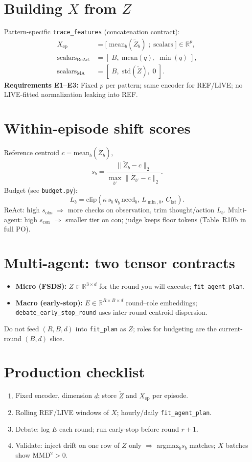 \documentclass[11pt]{article}
\begin{document}
\section{Building $X$ from $Z$}
Pattern-specific \texttt{trace\_features} (concatenation contract):
\begin{align*}
X_{\mathrm{ep}} &= \big[\;\mathrm{mean}_b(\tilde{Z}_b)\;;\;\text{scalars}\;\big] \in \mathbb{R}^{p}, \\
\text{scalars}_{\mathrm{ReAct}} &= [\;B,\;\mathrm{mean}(q),\;\min(q)\;], \\
\text{scalars}_{\mathrm{MA}} &= [\;B,\;\mathrm{std}(\tilde{Z}),\;0\;].
\end{align*}
\textbf{Requirements E1--E3:} Fixed $p$ per pattern; same encoder for REF/LIVE; no LIVE-fitted normalization leaking into REF.

\section{Within-episode shift scores}
Reference centroid $c=\mathrm{mean}_b(\tilde{Z}_b)$,
\[
s_b = \frac{\|\tilde{Z}_b-c\|_2}{\max_{b'}\|\tilde{Z}_{b'}-c\|_2}.
\]
Budget (see \texttt{budget.py}):
\[
L_b = \mathrm{clip}(\kappa\, s_b\, q_b\, \mathrm{need}_b,\, L_{\min,b},\, C_{\mathrm{lat}}).
\]
ReAct: high $s_{\mathrm{obs}}$ $\Rightarrow$ more checks on observation, trim thought/action $L_b$.
Multi-agent: high $s_{\mathrm{con}}$ $\Rightarrow$ smaller tier on con; judge keeps floor tokens (Table~R10b in full PO).

\section{Multi-agent: two tensor contracts}
\begin{itemize}[nosep]
  \item \textbf{Micro (FSDS):} $Z\in\mathbb{R}^{3\times d}$ for the round you will execute; \texttt{fit\_agent\_plan}.
  \item \textbf{Macro (early-stop):} $E\in\mathbb{R}^{R\times B\times d}$ round--role embeddings; \texttt{debate\_early\_stop\_round} uses inter-round centroid dispersion.
\end{itemize}
Do not feed $(R,B,d)$ into \texttt{fit\_plan} as $Z$; roles for budgeting are the current-round $(B,d)$ slice.

\section{Production checklist}
\begin{enumerate}
  \item Fixed encoder, dimension $d$; store $\tilde{Z}$ and $X_{\mathrm{ep}}$ per episode.
  \item Rolling REF/LIVE windows of $X$; hourly/daily \texttt{fit\_agent\_plan}.
  \item Debate: log $E$ each round; run early-stop before round $r{+}1$.
  \item Validate: inject drift on one row of $Z$ only $\Rightarrow$ argmax$_b s_b$ matches; $X$ batches show MMD$^2>0$.
\end{enumerate}
\end{document}
